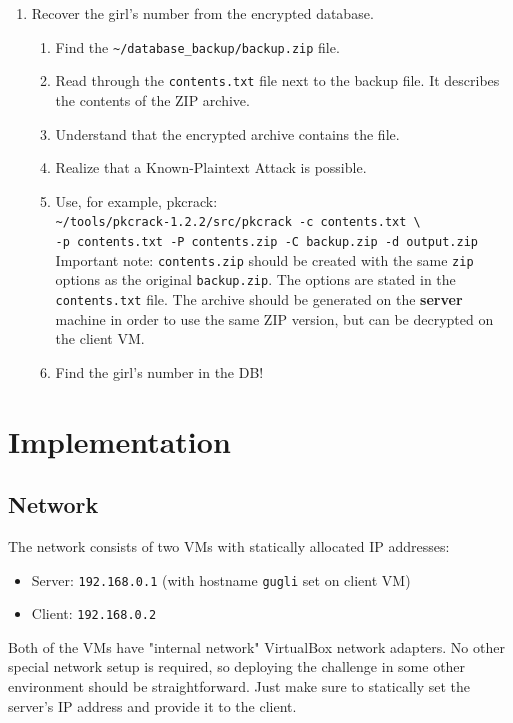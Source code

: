 \documentclass[11pt, a4paper]{article}
\begin{document}
\begin{enumerate}
      \item Recover the girl's number from the encrypted database.
        \begin{enumerate}
          \item Find the \texttt{\textasciitilde/database\_backup/backup.zip} file.
          \item Read through the \texttt{contents.txt} file next to the backup file.
            It describes the contents of the ZIP archive.
          \item Understand that the encrypted archive contains the file.
          \item Realize that a Known-Plaintext Attack is possible.
          \item Use, for example, pkcrack:\\
            \texttt{\textasciitilde/tools/pkcrack-1.2.2/src/pkcrack -c contents.txt \textbackslash}\\
            \texttt{-p contents.txt -P contents.zip -C backup.zip -d output.zip}\\
            Important note: \texttt{contents.zip} should be created with the same \texttt{zip}
            options as the original \texttt{backup.zip}. The options are stated
            in the \texttt{contents.txt} file. The archive should be generated on the
            \textbf{server} machine in order to use the same ZIP version,
            but can be decrypted on the client VM.
          \item Find the girl's number in the DB!
        \end{enumerate}

\end{enumerate}


\section{Implementation}

\subsection{Network}
  The network consists of two VMs with statically allocated IP addresses:
  \begin{itemize}
    \item Server: \texttt{192.168.0.1} (with hostname \texttt{gugli} set on client VM)
    \item Client: \texttt{192.168.0.2}
  \end{itemize}
  Both of the VMs have "internal network" VirtualBox network adapters. No other
  special network setup is required, so deploying the challenge in some other
  environment should be straightforward. Just make sure to statically set the
  server's IP address and provide it to the client.
\end{document}
